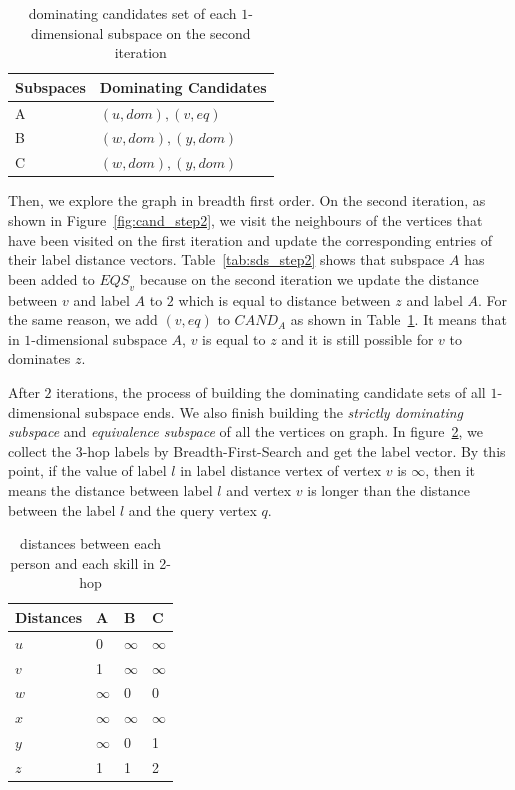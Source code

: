 \begin{table}[H]
    \centering

    \begin{tabular}{|l|l|}
    \hline
    Subspaces & Dominating Candidates \\ \hline
    A         & $(u, dom), (v, eq)$            \\ \hline
    B         & $(w, dom), (y, dom)$            \\ \hline
    C         & $(w, dom), (y, dom)$            \\ \hline
    \end{tabular}
    \caption{\label{font-table}dominating candidates set of each $1$-dimensional subspace on the second iteration}
    \label{tab:cand_set_step2}
\end{table}


Then, we explore the graph in breadth first order. On the second iteration, as shown in Figure~\ref{fig:cand_step2}, we visit the neighbours of the vertices that have been visited on the first iteration and update the corresponding entries of their label distance vectors. Table~\ref{tab:sds_step2} shows that subspace $A$ has been added to $\mathit{EQS}_v$ because on the second iteration we update the distance between $v$ and label $A$ to $2$ which is equal to distance between $z$ and label $A$. For the same reason, we add $(v, eq)$ to $\mathit{CAND}_A$ as shown in Table~\ref{tab:cand_set_step2}. It means that in $1$-dimensional subspace $A$, $v$ is equal to $z$ and it is still possible for $v$ to dominates $z$.

After $2$ iterations, the process of building the  dominating candidate sets of all $1$-dimensional subspace ends. We also finish building the \emph{strictly dominating subspace} and \emph{equivalence subspace} of all the vertices on graph. In figure~\ref{tab:d_hops_distance}, we collect the $3$-hop labels by Breadth-First-Search and get the label vector. By this point, if the value of label $l$ in label distance vertex of vertex $v$ is $\infty$, then it means the distance between label $l$ and vertex $v$ is longer than the distance between the label $l$ and the query vertex $q$.

\begin{table}[h]
    \centering
    \begin{tabular}{llll}
    \hline
    Distances & A & B & C \\ \hline
    $u$       & 0 & $\infty$ & $\infty$ \\ \hline
    $v$       & 1 & $\infty$ & $\infty$ \\ \hline
    $w$       & $\infty$ & 0 & 0 \\ \hline
    $x$       & $\infty$ & $\infty$ & $\infty$ \\ \hline
    $y$       & $\infty$ & 0 & 1 \\ \hline
    $z$       & 1 & 1 & 2 \\ \hline
    \end{tabular}
    \caption{\label{font-table} distances between each person and each skill in 2-hop}
    \label{tab:d_hops_distance}
\end{table}

